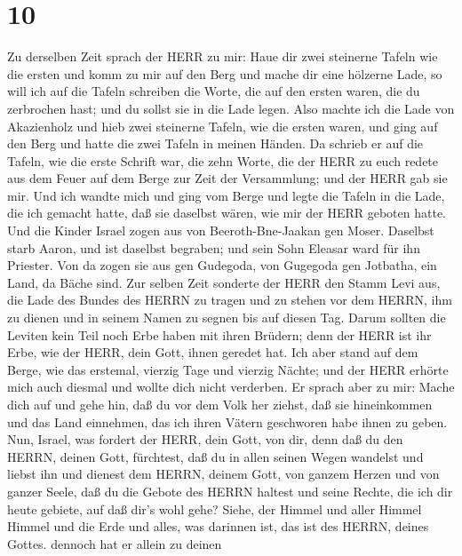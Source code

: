 \hypertarget{section-9}{%
\section{10}\label{section-9}}

 Zu derselben Zeit sprach der HERR zu mir: Haue dir zwei
steinerne Tafeln wie die ersten und komm zu mir auf den Berg und mache
dir eine hölzerne Lade,  so will ich auf die Tafeln
schreiben die Worte, die auf den ersten waren, die du zerbrochen hast;
und du sollst sie in die Lade legen.  Also machte ich die
Lade von Akazienholz und hieb zwei steinerne Tafeln, wie die ersten
waren, und ging auf den Berg und hatte die zwei Tafeln in meinen Händen.
 Da schrieb er auf die Tafeln, wie die erste Schrift war,
die zehn Worte, die der HERR zu euch redete aus dem Feuer auf dem Berge
zur Zeit der Versammlung; und der HERR gab sie mir.  Und ich
wandte mich und ging vom Berge und legte die Tafeln in die Lade, die ich
gemacht hatte, daß sie daselbst wären, wie mir der HERR geboten hatte.
 Und die Kinder Israel zogen aus von Beeroth-Bne-Jaakan gen
Moser. Daselbst starb Aaron, und ist daselbst begraben; und sein Sohn
Eleasar ward für ihn Priester.  Von da zogen sie aus gen
Gudegoda, von Gugegoda gen Jotbatha, ein Land, da Bäche sind.
 Zur selben Zeit sonderte der HERR den Stamm Levi aus, die
Lade des Bundes des HERRN zu tragen und zu stehen vor dem HERRN, ihm zu
dienen und in seinem Namen zu segnen bis auf diesen Tag. 
Darum sollten die Leviten kein Teil noch Erbe haben mit ihren Brüdern;
denn der HERR ist ihr Erbe, wie der HERR, dein Gott, ihnen geredet hat.
 Ich aber stand auf dem Berge, wie das erstemal, vierzig
Tage und vierzig Nächte; und der HERR erhörte mich auch diesmal und
wollte dich nicht verderben.  Er sprach aber zu mir: Mache
dich auf und gehe hin, daß du vor dem Volk her ziehst, daß sie
hineinkommen und das Land einnehmen, das ich ihren Vätern geschworen
habe ihnen zu geben.  Nun, Israel, was fordert der HERR,
dein Gott, von dir, denn daß du den HERRN, deinen Gott, fürchtest, daß
du in allen seinen Wegen wandelst und liebst ihn und dienest dem HERRN,
deinem Gott, von ganzem Herzen und von ganzer Seele,  daß
du die Gebote des HERRN haltest und seine Rechte, die ich dir heute
gebiete, auf daß dir's wohl gehe?  Siehe, der Himmel und
aller Himmel Himmel und die Erde und alles, was darinnen ist, das ist
des HERRN, deines Gottes.  dennoch hat er allein zu deinen
